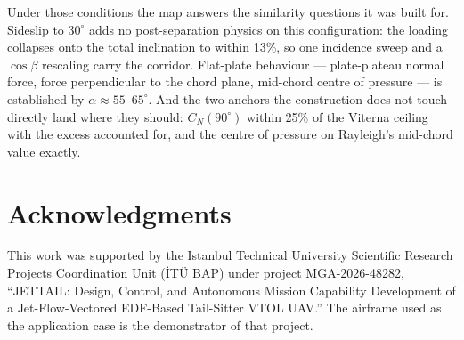 \documentclass[submit]{aiaa-tc}
\begin{document}
Under those conditions the map answers the similarity questions it was
built for. Sideslip to $30^\circ$ adds no post-separation physics on
this configuration: the loading collapses onto the total inclination to
within 13\%, so one incidence sweep and a $\cos\beta$ rescaling carry
the corridor. Flat-plate behaviour --- plate-plateau normal force,
force perpendicular to the chord plane, mid-chord centre of pressure
--- is established by $\alpha \approx 55$--$65^\circ$. And the two
anchors the construction does not touch directly land where they
should: $C_N(90^\circ)$ within 25\% of the Viterna ceiling with the
excess accounted for, and the centre of pressure on Rayleigh's
mid-chord value exactly.

\section*{Acknowledgments}

This work was supported by the Istanbul Technical University Scientific
Research Projects Coordination Unit (\.IT\"U BAP) under project
MGA-2026-48282, ``JETTAIL: Design, Control, and Autonomous Mission
Capability Development of a Jet-Flow-Vectored EDF-Based Tail-Sitter VTOL
UAV.'' The airframe used as the application case is the demonstrator of
that project.




\end{document}
